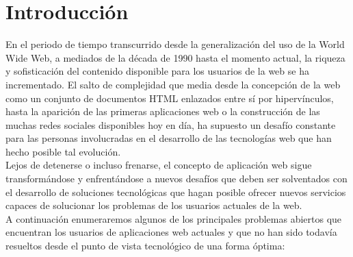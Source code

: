 \chapter{Introducci\'on}

En el periodo de tiempo transcurrido desde la generalizaci\'on del uso de la World Wide Web, a mediados de la d\'ecada de 1990 hasta el momento actual, 
la riqueza y sofisticaci\'on del contenido disponible para los usuarios de la web se ha incrementado.
El salto de complejidad que media desde la concepci\'on de la web como un conjunto de documentos HTML enlazados entre s\'i por hiperv\'inculos, 
hasta la aparici\'on de las primeras aplicaciones web o la construcci\'on de las muchas redes sociales disponibles hoy en d\'ia, ha supuesto un desaf\'io constante 
para las personas involucradas en el desarrollo de las tecnolog\'ias web que han hecho posible tal evoluci\'on.\\
Lejos de detenerse o incluso frenarse, el concepto de aplicaci\'on web sigue transform\'andose y enfrent\'andose a nuevos desaf\'ios que deben ser solventados
 con el desarrollo de soluciones tecnol\'ogicas que hagan posible ofrecer nuevos servicios capaces de solucionar los problemas de los usuarios actuales de la web.\\
A continuaci\'on enumeraremos algunos de los principales problemas abiertos que encuentran los usuarios de aplicaciones web actuales y que no han sido todav\'ia 
resueltos desde el punto de vista tecnol\'ogico de una forma \'optima:

